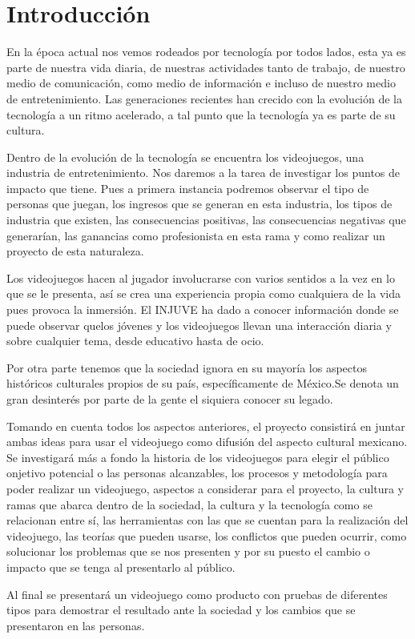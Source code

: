 \chapter{Introducción}

En la época actual nos vemos rodeados por tecnología por todos lados, esta ya es parte de nuestra vida diaria, de nuestras actividades tanto de trabajo, de nuestro medio de comunicación, como medio de información e incluso de nuestro medio de entretenimiento. Las generaciones recientes han crecido con la evolución de la tecnología a un ritmo acelerado, a tal punto que la tecnología ya es parte de su cultura.

Dentro de la evolución de la tecnología se encuentra los videojuegos, una industria de entretenimiento.  
Nos daremos a la tarea de investigar los puntos de impacto que tiene. Pues a primera instancia podremos observar el tipo de personas que juegan, los ingresos que se generan en esta industria, los tipos de industria que existen, las consecuencias positivas, las consecuencias negativas que generarían, las ganancias como profesionista en esta rama y como realizar un proyecto de esta naturaleza.

Los videojuegos hacen al jugador involucrarse con varios sentidos a la vez en lo que se le presenta, así se crea una experiencia propia como cualquiera de la vida pues provoca la inmersión. El INJUVE ha dado a conocer información donde se puede observar quelos jóvenes y los videojuegos llevan una interacción diaria y sobre cualquier tema, desde educativo hasta de ocio.

Por otra parte tenemos que la sociedad ignora en su mayoría los aspectos históricos culturales propios de su país, específicamente de México.Se denota un gran desinterés por parte de la gente el siquiera conocer su legado.

Tomando en cuenta todos los aspectos anteriores, el proyecto consistirá en juntar ambas ideas para usar el videojuego como difusión del aspecto cultural mexicano. Se investigará más a fondo la historia de los videojuegos para elegir el público onjetivo potencial o las personas alcanzables, los procesos y metodología para poder realizar un videojuego, aspectos a considerar para el proyecto, la cultura y ramas que abarca dentro de la sociedad, la cultura y la tecnología como se relacionan entre sí, las herramientas con las que se cuentan para la realización del videojuego, las teorías que pueden usarse, los conflictos que pueden ocurrir, como solucionar los problemas que se nos presenten y por su puesto el cambio o impacto que se tenga al presentarlo al público.

Al final se presentará un videojuego como producto con pruebas de diferentes tipos para demostrar el resultado ante la sociedad y los cambios que se presentaron en las personas.